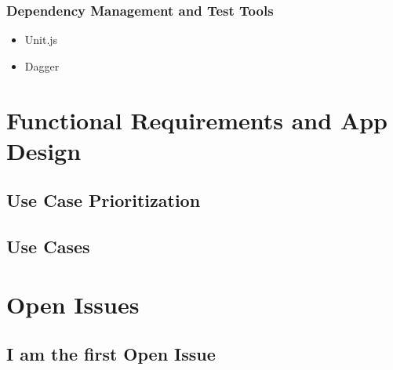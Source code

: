 \documentclass[11pt,fleqn]{book} %
\begin{document}
		\subsection{Dependency Management and Test Tools}
			\begin{itemize}
				\item Unit.js
				\item Dagger
			\end{itemize}



\chapter{Functional Requirements and App Design}

	\section{Use Case Prioritization}
		
	\section{Use Cases}
	
	


\chapter{Open Issues}

\section{I am the first Open Issue}
\end{document}
